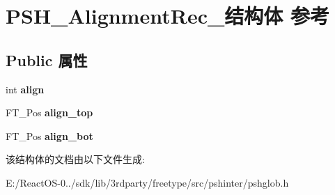 \hypertarget{struct_p_s_h___alignment_rec__}{}\section{P\+S\+H\+\_\+\+Alignment\+Rec\+\_\+结构体 参考}
\label{struct_p_s_h___alignment_rec__}
\subsection*{Public 属性}
\begin{DoxyCompactItemize}
\item 
\mbox{\label{struct_p_s_h___alignment_rec___ae3e8c38c467a36922be68acdfc5e0f83}} 
int {\bfseries align}
\item 
\mbox{\label{struct_p_s_h___alignment_rec___aa1138ec07d93acff80b1edd7be62ba44}} 
F\+T\+\_\+\+Pos {\bfseries align\+\_\+top}
\item 
\mbox{\label{struct_p_s_h___alignment_rec___ab6bfd035d92fb362085832c1e4a5e2f0}} 
F\+T\+\_\+\+Pos {\bfseries align\+\_\+bot}
\end{DoxyCompactItemize}


该结构体的文档由以下文件生成\+:\begin{DoxyCompactItemize}
\item 
E\+:/\+React\+O\+S-\/0../sdk/lib/3rdparty/freetype/src/pshinter/pshglob.\+h\end{DoxyCompactItemize}

